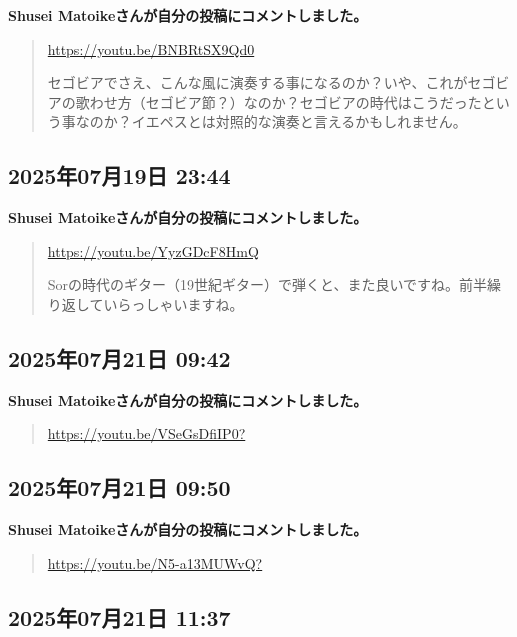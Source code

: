 \textbf{Shusei Matoikeさんが自分の投稿にコメントしました。}

\begin{quote}
\url{https://youtu.be/BNBRtSX9Qd0}

セゴビアでさえ、こんな風に演奏する事になるのか？いや、これがセゴビアの歌わせ方（セゴビア節？）なのか？セゴビアの時代はこうだったという事なのか？イエペスとは対照的な演奏と言えるかもしれません。
\end{quote}

\subsection*{2025年07月19日 23:44}

\textbf{Shusei Matoikeさんが自分の投稿にコメントしました。}

\begin{quote}
\url{https://youtu.be/YyzGDcF8HmQ}

Sorの時代のギター（19世紀ギター）で弾くと、また良いですね。前半繰り返していらっしゃいますね。
\end{quote}

\subsection*{2025年07月21日 09:42}

\textbf{Shusei Matoikeさんが自分の投稿にコメントしました。}

\begin{quote}
\url{https://youtu.be/VSeGsDfiIP0?}
\end{quote}

\subsection*{2025年07月21日 09:50}

\textbf{Shusei Matoikeさんが自分の投稿にコメントしました。}

\begin{quote}
\url{https://youtu.be/N5-a13MUWvQ?}
\end{quote}

\subsection*{2025年07月21日 11:37}

